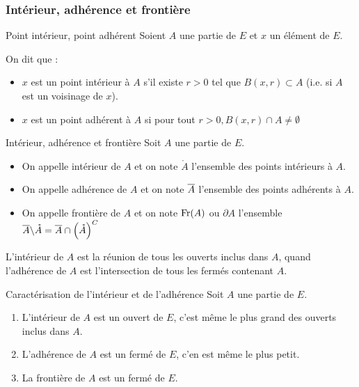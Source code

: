     \subsubsection{Intérieur, adhérence et frontière}

    \begin{defi}{Point intérieur, point adhérent}{}
        Soient $A$ une partie de $E$ et $x$ un élément de $E$.

        On dit que :
        \begin{itemize}
            \item $x$ est un point intérieur à $A$ s’il existe $r > 0$ tel que $B(x,r) \subset A$ (i.e. si $A$ est un voisinage de $x$).
            \item $x$ est un point adhérent à $A$ si pour tout $r > 0, B(x,r) \cap A \neq \emptyset$
        \end{itemize}
    \end{defi}

    \begin{defi}{Intérieur, adhérence et frontière}
        Soit $A$ une partie de $E$.
        \begin{itemize}
            \item On appelle intérieur de $A$ et on note $\mathring{A}$ l’ensemble des points intérieurs à $A$.
            \item On appelle adhérence de $A$ et on note $\overline{A}$ l’ensemble des points adhérents à $A$.
            \item On appelle frontière de $A$ et on note $\operatorname{Fr}(A)$ ou $\partial A$ l’ensemble $\overline{A} \backslash \mathring{A} = \overline{A} \cap \left(\mathring{A}\right)^C$
        \end{itemize}
    \end{defi}

    L’intérieur de $A$ est la réunion de tous les ouverts inclus dans $A$, quand l’adhérence de $A$ est l’intersection de tous les fermés contenant $A$.

    \begin{prop}{Caractérisation de l’intérieur et de l’adhérence}
        Soit $A$ une partie de $E$.
        \begin{enumerate}
            \item L’intérieur de $A$ est un ouvert de $E$, c’est même le plus grand des ouverts inclus dans $A$.
            \item L’adhérence de $A$ est un fermé de $E$, c’en est même le plus petit.
            \item La frontière de $A$ est un fermé de $E$.
        \end{enumerate}
    \end{prop}

